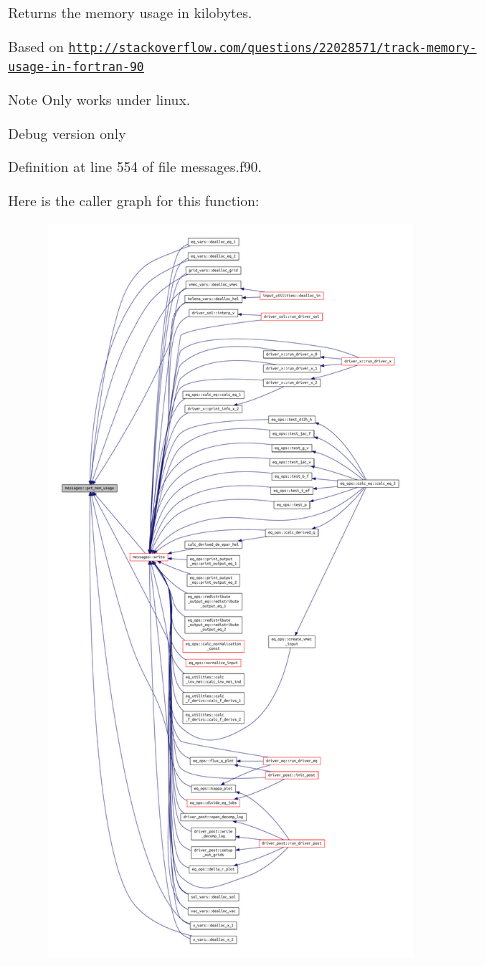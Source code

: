 Returns the memory usage in kilobytes. 

Based on \href{http://stackoverflow.com/questions/22028571/track-memory-usage-in-fortran-90}{\tt http\+://stackoverflow.\+com/questions/22028571/track-\/memory-\/usage-\/in-\/fortran-\/90}

\begin{DoxyNote}{Note}
Only works under linux.

Debug version only 
\end{DoxyNote}


Definition at line 554 of file messages.\+f90.

Here is the caller graph for this function\+:\nopagebreak
\begin{figure}[H]
\begin{center}
\leavevmode
\includegraphics[height=550pt]{namespacemessages_a82dddaab795b78b3d39e1ff1aab2f665_icgraph}
\end{center}
\end{figure}
\mbox{\label{namespacemessages_a5e45296f088e9f31115a3b8d869f3177}} 

